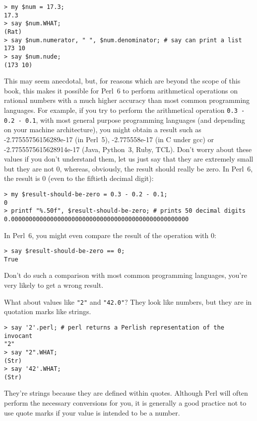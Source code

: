 \begin{verbatim}
> my $num = 17.3;
17.3
> say $num.WHAT;
(Rat)
> say $num.numerator, " ", $num.denominator; # say can print a list
173 10
> say $num.nude;
(173 10) 
\end{verbatim}
%
This may seem anecdotal, but, for reasons which are 
beyond the scope of this book, this makes it possible for Perl~6 
to perform arithmetical operations on rational numbers with 
a much higher accuracy than most common programming languages. 
For example, if you try to perform the arithmetical operation
\verb'0.3 - 0.2 - 0.1', with most general purpose programming languages 
(and depending on your machine architecture), you 
might obtain a result such as -2.77555756156289e-17 (in Perl~5), 
-2.775558e-17 (in C under gcc) or -2.7755575615628914e-17 
(Java, Python~3, Ruby, TCL). Don't worry about these values if you 
don't understand them, let us just say that they  are 
extremely small but they are not 0, whereas,  
obviously, the result should really be zero. In Perl~6, 
the result is 0 (even to the fiftieth decimal digit):
\begin{verbatim}
> my $result-should-be-zero = 0.3 - 0.2 - 0.1;
0
> printf "%.50f", $result-should-be-zero; # prints 50 decimal digits
0.00000000000000000000000000000000000000000000000000
\end{verbatim}
%
In Perl~6, you might even compare the result of the operation with 0:
\begin{verbatim}
> say $result-should-be-zero == 0;
True
\end{verbatim}
%
Don't do such a comparison with most common programming 
languages, you're very likely to get a wrong result.

What about values like \verb'"2"' and \verb'"42.0"'?
They look like numbers, but they are in quotation marks like
strings.

\begin{verbatim}
> say '2'.perl; # perl returns a Perlish representation of the invocant
"2"
> say "2".WHAT;
(Str)
> say '42'.WHAT;
(Str)
\end{verbatim}
%

They're strings because they are defined within quotes. Although 
Perl will often perform the necessary conversions for you, it 
is generally a good practice not to use quote marks if your value 
is intended to be a number.

